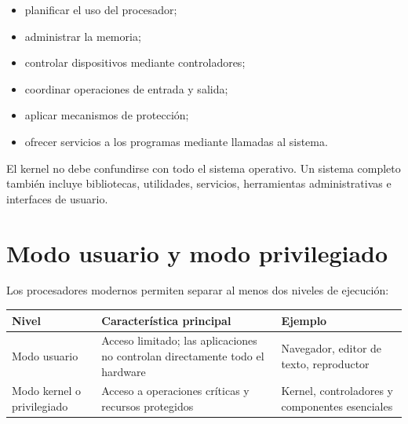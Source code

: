 \documentclass[
  spanish,
  letterpaper,
]{scrbook}
\newcounter{none} %
\providecommand{\tightlist}{%
  \setlength{\itemsep}{0pt}\setlength{\parskip}{0pt}}
\begin{document}
\begin{itemize}
\tightlist
\item
  planificar el uso del procesador;
\item
  administrar la memoria;
\item
  controlar dispositivos mediante controladores;
\item
  coordinar operaciones de entrada y salida;
\item
  aplicar mecanismos de protección;
\item
  ofrecer servicios a los programas mediante llamadas al sistema.
\end{itemize}

El kernel no debe confundirse con todo el sistema operativo. Un sistema
completo también incluye bibliotecas, utilidades, servicios,
herramientas administrativas e interfaces de usuario.

\section{Modo usuario y modo
privilegiado}\label{modo-usuario-y-modo-privilegiado}

Los procesadores modernos permiten separar al menos dos niveles de
ejecución:

{\def\LTcaptype{none} %
\begin{longtable}[]{@{}
  >{\raggedright\arraybackslash}p{}
  >{\raggedright\arraybackslash}p{}
  >{\raggedright\arraybackslash}p{}@{}}
\toprule\noalign{}
\begin{minipage}[b]{\linewidth}\raggedright
Nivel
\end{minipage} & \begin{minipage}[b]{\linewidth}\raggedright
Característica principal
\end{minipage} & \begin{minipage}[b]{\linewidth}\raggedright
Ejemplo
\end{minipage} \\
\midrule\noalign{}
\endhead
\bottomrule\noalign{}
\endlastfoot
Modo usuario & Acceso limitado; las aplicaciones no controlan
directamente todo el hardware & Navegador, editor de texto,
reproductor \\
Modo kernel o privilegiado & Acceso a operaciones críticas y recursos
protegidos & Kernel, controladores y componentes esenciales \\
\end{longtable}
}
\end{document}
